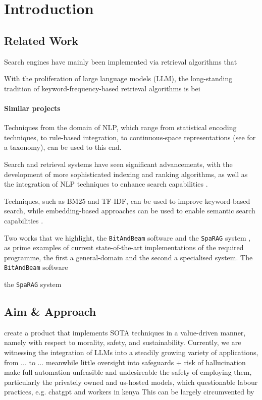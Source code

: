 \section{Introduction}


\subsection{Related Work}

Search engines have mainly been implemented via retrieval algorithms that 


With the proliferation of large language models (LLM), the long-standing tradition of keyword-frequency-based retrieval algorithms is bei






\paragraph{Similar projects} 
Techniques from the domain of NLP, which range from statistical encoding techniques, to rule-based integration, to continuous-space representations (see \textcite{patilSurveyTextRepresentation2023} for a taxonomy), can be used to this end.

Search and retrieval systems have seen significant advancements, with the development of more sophisticated indexing and ranking algorithms, as well as the integration of NLP techniques to enhance search capabilities \cite{shalagin2024survey}.

Techniques, such as BM25 and TF-IDF, can be used to improve keyword-based search, while embedding-based approaches can be used to enable semantic search capabilities \cite{patilSurveyTextRepresentation2023}.


Two works that we highlight, the \texttt{BitAndBeam} software \cite{BitAndBeam} and the \texttt{SpaRAG} system \cite{gobels2024towards}, as prime examples of current state-of-the-art implementations of the required programme, the first a general-domain and the second a specialised system.
The \texttt{BitAndBeam} software \cite{BitAndBeam} 

the \texttt{SpaRAG} system \cite{gobels2024towards}



\subsection{Aim \& Approach}

create a product that implements SOTA techniques in a value-driven manner, namely with respect to morality, safety, and sustainability.
Currently, we are witnessing the integration of LLMs into a steadily growing variety of applications, from ... to ...
meanwhile little oversight into safeguards + risk of hallucination make full automation unfeasible and undesireable 
the safety of employing them, particularly the privately owned and us-hosted models, which questionable labour practices, e.g. chatgpt and workers in kenya 
This can be largely circumvented by 

